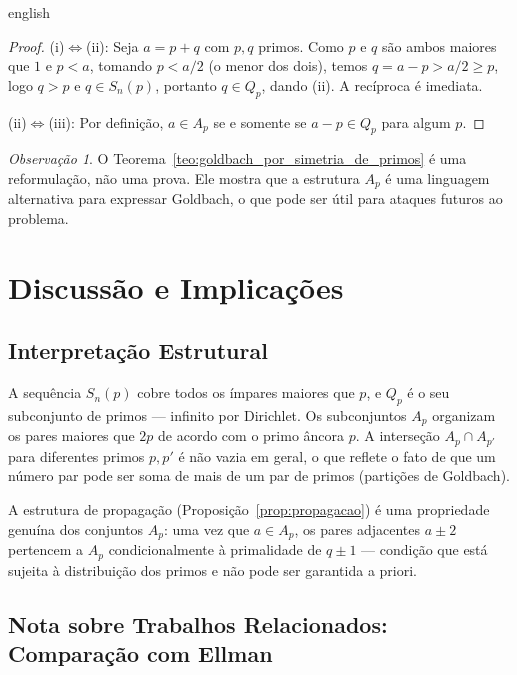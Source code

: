 \documentclass[a4paper,11pt]{article}
\theoremstyle{definition}
\theoremstyle{remark}
\newtheorem{remark}[theorem]{Observação}
\begin{document}
\begin{otherlanguage*}{english}
		\begin{proof}
			(i)$\Leftrightarrow$(ii): Seja $a = p + q$ com $p, q$ primos. Como $p$
			e $q$ são ambos maiores que $1$ e $p < a$, tomando $p < a/2$ (o menor
			dos dois), temos $q = a - p > a/2 \geq p$, logo $q > p$ e $q \in S_n(p)$,
			portanto $q \in Q_p$, dando (ii). A recíproca é imediata.
			
			(ii)$\Leftrightarrow$(iii): Por definição, $a \in A_p$ se e somente se
			$a - p \in Q_p$ para algum $p$.
		\end{proof}
		
		\begin{remark}
			O Teorema~\ref{teo:goldbach_por_simetria_de_primos} é uma reformulação,
			não uma prova. Ele mostra que a estrutura $A_p$ é uma linguagem alternativa
			para expressar Goldbach, o que pode ser útil para ataques futuros ao problema.
		\end{remark}
		
		\section{Discussão e Implicações}\label{sec:discussao}
		
		\subsection{Interpretação Estrutural}
		
		A sequência $S_n(p)$ cobre todos os ímpares maiores que $p$, e $Q_p$ é o
		seu subconjunto de primos — infinito por Dirichlet. Os subconjuntos $A_p$
		organizam os pares maiores que $2p$ de acordo com o primo âncora $p$. A
		interseção $A_p \cap A_{p'}$ para diferentes primos $p, p'$ é não vazia em
		geral, o que reflete o fato de que um número par pode ser soma de mais de
		um par de primos (partições de Goldbach).
		
		A estrutura de propagação (Proposição~\ref{prop:propagacao}) é uma
		propriedade genuína dos conjuntos $A_p$: uma vez que $a \in A_p$, os pares
		adjacentes $a \pm 2$ pertencem a $A_p$ condicionalmente à primalidade de
		$q \pm 1$ — condição que está sujeita à distribuição dos primos e não pode
		ser garantida a priori.
		
		\subsection{Nota sobre Trabalhos Relacionados: Comparação com Ellman}
		\label{sec:ellman}
		

\end{otherlanguage*}
\end{document}
